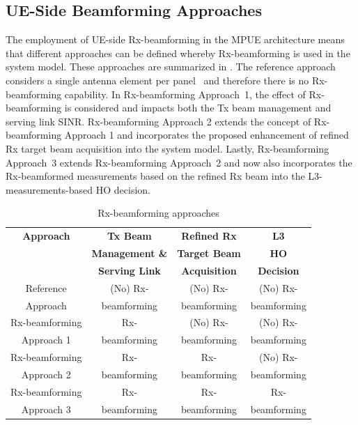 \documentclass[10pt, conference]{IEEEtran}
\begin{document}
\subsection{UE-Side Beamforming Approaches} \label{Subsection3.2}
The employment of UE-side Rx-beamforming in the MPUE architecture means that different approaches can be defined whereby Rx-beamforming is used in the system model. These approaches are summarized in . The reference approach considers a single antenna element per panel~\cite{b4} and therefore there is no Rx-beamforming capability. In Rx-beamforming Approach~1, the effect of Rx-beamforming is considered and impacts both the Tx beam management and serving link SINR.  Rx-beamforming Approach 2 extends the concept of Rx-beamforming Approach 1 and incorporates the proposed enhancement of refined Rx target beam acquisition into the system model. Lastly, Rx-beamforming Approach~3 extends Rx-beamforming Approach~2 and now also incorporates the Rx-beamformed measurements based on the refined Rx beam into the L3-measurements-based HO decision.

%

\begin{table}[!t]
\begin{center}
\caption{Rx-beamforming approaches}
 \vspace{-4pt}
\label{Table1}
\begin{tabular}{| c | c | c | c |}
\hline
\bfseries Approach & \bfseries Tx Beam   & \bfseries Refined Rx   & \bfseries  L3 \\
\bfseries & \bfseries  Management \&   & \bfseries  Target Beam   & \bfseries HO  \\
\bfseries & \bfseries Serving Link & \bfseries Acquisition  & \bfseries  Decision \\
\hline
Reference & (No) Rx- & (No) Rx- & (No) Rx- \\
Approach  &  beamforming &  beamforming & beamforming \\
\hline
Rx-beamforming & Rx- & (No) Rx- & (No) Rx- \\
Approach 1 &  beamforming &  beamforming & beamforming \\
\hline
Rx-beamforming  & Rx- & Rx- & (No) Rx- \\
Approach 2 &  beamforming & beamforming &  beamforming\\
\hline
Rx-beamforming  & Rx- & Rx- & Rx- \\
Approach 3 &  beamforming & beamforming &  beamforming\\
\hline
\end{tabular}
\end{center}
 \vspace{-8pt}
\end{table}
\end{document}
